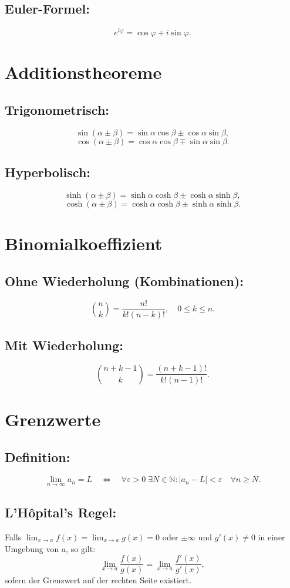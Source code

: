 \documentclass[12pt]{article}
\begin{document}
\subsection*{Euler-Formel:}
\[
e^{i\varphi} = \cos\varphi + i \sin\varphi.
\]

\section{Additionstheoreme}
\subsection*{Trigonometrisch:}
\[
\sin(\alpha \pm \beta) = \sin\alpha \cos\beta \pm \cos\alpha \sin\beta,
\]
\[
\cos(\alpha \pm \beta) = \cos\alpha \cos\beta \mp \sin\alpha \sin\beta.
\]
\subsection*{Hyperbolisch:}
\[
\sinh(\alpha \pm \beta) = \sinh\alpha \cosh\beta \pm \cosh\alpha \sinh\beta,
\]
\[
\cosh(\alpha \pm \beta) = \cosh\alpha \cosh\beta \pm \sinh\alpha \sinh\beta.
\]

\section{Binomialkoeffizient}
\subsection*{Ohne Wiederholung (Kombinationen):}
\[
\binom{n}{k} = \frac{n!}{k!(n-k)!}, \quad 0 \le k \le n.
\]
\subsection*{Mit Wiederholung:}
\[
\binom{n+k-1}{k} = \frac{(n+k-1)!}{k!(n-1)!}.
\]

\section{Grenzwerte}
\subsection*{Definition:}
\[
\lim_{n \to \infty} a_n = L \quad \Longleftrightarrow \quad \forall \varepsilon > 0 \; \exists N \in \mathbb{N} : |a_n - L| < \varepsilon \quad \forall n \ge N.
\]
\subsection*{L'Hôpital's Regel:}
Falls \( \lim_{x \to a} f(x) = \lim_{x \to a} g(x) = 0\) oder \(\pm\infty\) und \(g'(x) \neq 0\) in einer Umgebung von \(a\), so gilt:
\[
\lim_{x \to a} \frac{f(x)}{g(x)} = \lim_{x \to a} \frac{f'(x)}{g'(x)},
\]
sofern der Grenzwert auf der rechten Seite existiert.
\end{document}
